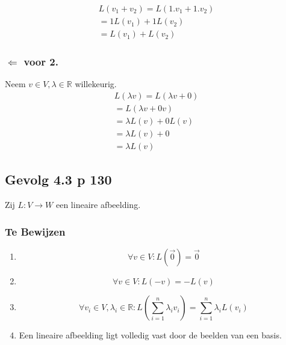 \documentclass[lineaire_algebra_oplossingen.tex]{subfiles}
\begin{document}
\begin{align*}
L(v_1 + v_2) = L(1.v_1+1.v_2) \tag{co\"effici\"ent 1 in V}\\
=1L(v_1)+1L(v_2) \tag{wegens 3.}\\
=L(v_1)+L(v_2) \tag{co\"effici\"ent 1 in W}
\end{align*}

\subsubsection*{$\Leftarrow$ voor 2.}
Neem $v\in V, \lambda \in \mathbb{R}$ willekeurig.
\begin{align*}
L(\lambda v)=L(\lambda v + 0) \tag{neutraal element in V}\\
=L(\lambda v + 0v)\tag{Lemma 3.8}\\
=\lambda L(v) + 0 L(v) \tag{wegens 3.}\\
=\lambda L(v) + 0 \tag{Lemma 3.8 in W}\\
=\lambda L(v) \tag{neutraal element in W}
\end{align*}

\subsection{Gevolg 4.3 p 130}
Zij $L:V\rightarrow W$ een lineaire afbeelding.
\subsubsection*{Te Bewijzen}
\begin{enumerate}
\item
\[\forall v \in V: L(\vec{0})=\vec{0}\]
\item
\[\forall v \in V: L(-v)=-L(v)\]
\item
\[\forall v_i\in V, \lambda_i \in \mathbb{R}: L\left(\sum_{i=1}^n\lambda_iv_i\right) = \sum_{i=1}^n\lambda_iL(v_i)\]
\item
Een lineaire afbeelding ligt volledig vast door de beelden van een basis.
\end{enumerate}
\end{document}
